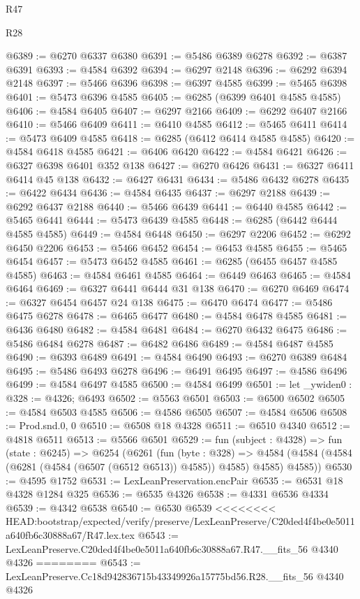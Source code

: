 \begin{lexlean}{R47}
\begin{lexlean}{R28}
\begin{coremodule}
{{{{{{{{{{{{{{{{{{{{{{{{{{{{{{{{{{{{{{{{{{{{{{{{{{{{{{{{{{{{{{{{{{{{{{{{{{{{{{{{{{{{{{{{{{{{{{{{{{{{{{{{{{{{{{{{{{{{{{{{{{{{{{{{{{{{{@6389 := @6270 @6337 @6380
@6391 := @5486 @6389 @6278
@6392 := @6387 @6391
@6393 := @4584 @6392
@6394 := @6297 @2148
@6396 := @6292 @6394 @2148
@6397 := @5466 @6396
@6398 := @6397 @4585
@6399 := @5465 @6398
@6401 := @5473 @6396 @4585
@6405 := @6285 (@6399 @6401 @4585 @4585)
@6406 := @4584 @6405
@6407 := @6297 @2166
@6409 := @6292 @6407 @2166
@6410 := @5466 @6409
@6411 := @6410 @4585
@6412 := @5465 @6411
@6414 := @5473 @6409 @4585
@6418 := @6285 (@6412 @6414 @4585 @4585)
@6420 := @4584 @6418 @4585
@6421 := @6406 @6420
@6422 := @4584 @6421
@6426 := @6327 @6398 @6401 @352 @138
@6427 := @6270 @6426
@6431 := @6327 @6411 @6414 @45 @138
@6432 := @6427 @6431
@6434 := @5486 @6432 @6278
@6435 := @6422 @6434
@6436 := @4584 @6435
@6437 := @6297 @2188
@6439 := @6292 @6437 @2188
@6440 := @5466 @6439
@6441 := @6440 @4585
@6442 := @5465 @6441
@6444 := @5473 @6439 @4585
@6448 := @6285 (@6442 @6444 @4585 @4585)
@6449 := @4584 @6448
@6450 := @6297 @2206
@6452 := @6292 @6450 @2206
@6453 := @5466 @6452
@6454 := @6453 @4585
@6455 := @5465 @6454
@6457 := @5473 @6452 @4585
@6461 := @6285 (@6455 @6457 @4585 @4585)
@6463 := @4584 @6461 @4585
@6464 := @6449 @6463
@6465 := @4584 @6464
@6469 := @6327 @6441 @6444 @31 @138
@6470 := @6270 @6469
@6474 := @6327 @6454 @6457 @24 @138
@6475 := @6470 @6474
@6477 := @5486 @6475 @6278
@6478 := @6465 @6477
@6480 := @4584 @6478 @4585
@6481 := @6436 @6480
@6482 := @4584 @6481
@6484 := @6270 @6432 @6475
@6486 := @5486 @6484 @6278
@6487 := @6482 @6486
@6489 := @4584 @6487 @4585
@6490 := @6393 @6489
@6491 := @4584 @6490
@6493 := @6270 @6389 @6484
@6495 := @5486 @6493 @6278
@6496 := @6491 @6495
@6497 := @4586 @6496
@6499 := @4584 @6497 @4585
@6500 := @4584 @6499
@6501 := let _ywiden0 : @328 := @4326; @6493
@6502 := @5563 @6501
@6503 := @6500 @6502
@6505 := @4584 @6503 @4585
@6506 := @4586 @6505
@6507 := @4584 @6506
@6508 := Prod.snd.{0, 0}
@6510 := @6508 @18 @4328
@6511 := @6510 @4340
@6512 := @4818 @6511
@6513 := @5566 @6501
@6529 := fun (subject : @4328) =>
  fun (state : @6245) =>
  @6254
    (@6261
      (fun (byte : @328) =>
      @4584 (@4584 (@4584 (@6281 (@4584 (@6507 (@6512 @6513)) @4585)) @4585) @4585) @4585))
@6530 := @4595 @1752
@6531 := LexLeanPreservation.encPair
@6535 := @6531 @18 @4328 @1284 @325
@6536 := @6535 @4326
@6538 := @4331 @6536 @4334
@6539 := @4342 @6538
@6540 := @6530 @6539
<<<<<<<< HEAD:bootstrap/expected/verify/preserve/LexLeanPreserve/C20ded4f4be0e5011a640fb6c30888a67/R47.lex.tex
@6543 := LexLeanPreserve.C20ded4f4be0e5011a640fb6c30888a67.R47.__fits_56 @4340 @4326
========
@6543 := LexLeanPreserve.Cc18d942836715b43349926a15775bd56.R28.__fits_56 @4340 @4326
}}}}}}}}}}}}}}}}}}}}}}}}}}}}}}}}}}}}}}}}}}}}}}}}}}}}}}}}}}}}}}}}}}}}}}}}}}}}}}}}}}}}}}}}}}}}}}}}}}}}}}}}}}}}}}}}}}}}}}}}}}}}}}}}}}}}}
\end{coremodule}
\end{lexlean}
\end{lexlean}
